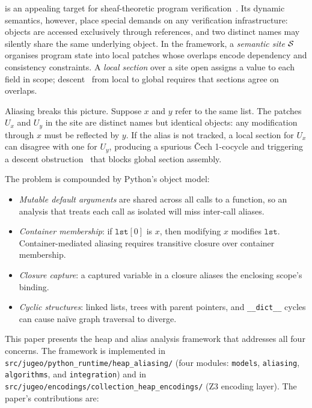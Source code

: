 \documentclass[11pt]{article}
\begin{document}
\Python{} is an appealing target for sheaf-theoretic program
verification~\cite{paper01}.  Its dynamic semantics, however, place
special demands on any verification infrastructure: objects are accessed
exclusively through references, and two distinct names may silently
share the same underlying object.  In the \JuGeo{} framework, a
\emph{semantic site} $\mathcal{S}$ organises program state into local patches
whose overlaps encode dependency and consistency constraints.  A
\emph{local section} over a site open assigns a value to each field in
scope; descent~\cite{paper03} from local to global requires that
sections agree on overlaps.

Aliasing breaks this picture.  Suppose $x$ and $y$ refer to the same
list.  The patches $U_x$ and $U_y$ in the site are distinct names but
identical objects: any modification through $x$ must be reflected by
$y$.  If the alias is not tracked, a local section for $U_x$ can
disagree with one for $U_y$, producing a spurious Čech 1-cocycle and
triggering a descent obstruction~\cite{paper03} that blocks global
section assembly.

The problem is compounded by Python's object model:
\begin{itemize}[noitemsep]
  \item \emph{Mutable default arguments} are shared across all calls to
    a function, so an analysis that treats each call as isolated will
    miss inter-call aliases.
  \item \emph{Container membership}: if $\mathtt{lst}[0]$ is $x$, then
    modifying $x$ modifies $\mathtt{lst}$.  Container-mediated aliasing
    requires transitive closure over container membership.
  \item \emph{Closure capture}: a captured variable in a closure aliases
    the enclosing scope's binding.
  \item \emph{Cyclic structures}: linked lists, trees with parent
    pointers, and \texttt{\_\_dict\_\_} cycles can cause naïve graph
    traversal to diverge.
\end{itemize}

This paper presents the \JuGeo{} heap and alias analysis framework that
addresses all four concerns.  The framework is implemented in
\texttt{src/jugeo/python\_runtime/heap\_aliasing/} (four modules:
\texttt{models}, \texttt{aliasing}, \texttt{algorithms}, and
\texttt{integration}) and in
\texttt{src/jugeo/encodings/collection\_heap\_encodings/} (Z3 encoding
layer).  The paper's contributions are:
\end{document}
